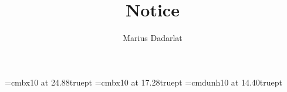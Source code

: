 \addtolength{\oddsidemargin}{-6em}                               %
\addtolength{\textwidth}{12em}                                   %
\addtolength{\topmargin}{-17ex}                                   %
\addtolength{\textheight}{32ex}
\font\TitleFont=cmbx10 at 24.88truept
\font\DateFont=cmbx10 at 17.28truept
\font\SubTitleFont=cmdunh10 at 14.40truept
\newcommand{\st}{^{\textstyle{\ast}}}
\newcommand{\iinfo}[2]{{\raggedright{\em#1}}\\ &{\raggedright{\hspace*{.2truein}#2}}\\[1ex]}
\newcommand{\cinfo}[2]{{\raggedright{\hspace*{.2truein}\em#1}}\\ &{\raggedright{\hspace*{.2truein}\hspace*{.2truein}#2}}\\[1ex]}
\newcommand{\CONT}{{\raggedright{\bf Session for contributed papers}}\\}
\newcommand{\CONTP}{{\raggedright{\bf Parallel Sessions for contributed papers}}\\}
\newcommand{\rmB}{\ \ \ \ Room: 252&}
\newcommand{\rmA}{\ \ \ \ Room: 274&}
\newcommand{\rmC}{\ \ \ \ Room: 274&}
\newcommand{\rmD}{\ \ \ \ Room: TBA&}
\pagestyle{empty}                                               %
\title{Notice}                                               %
\author{Marius Dadarlat}                                          %

